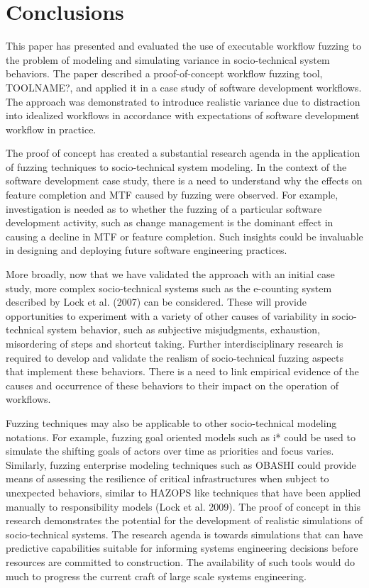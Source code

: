 \documentclass{llncs}
\begin{document}
\section{Conclusions}

This paper has presented and evaluated the use of executable workflow fuzzing to the problem of modeling and simulating
variance in socio-technical system behaviors.  The paper described a proof-of-concept workflow fuzzing tool, TOOLNAME?,
and applied it in a case study of software development workflows.  The approach was demonstrated to introduce realistic
variance due to distraction into idealized workflows in accordance with expectations of software development workflow in
practice.

The proof of concept has created a substantial research agenda in the application of fuzzing techniques to
socio-technical system modeling.  In the context of the software development case study, there is a need to understand
why the effects on feature completion and MTF caused by fuzzing were observed.  For example, investigation is needed as
to whether the fuzzing of a particular software development activity, such as change management is the dominant effect
in causing a decline in MTF or feature completion.  Such insights could be invaluable in designing and deploying future
software engineering practices.

More broadly, now that we have validated the approach with an initial case study, more complex socio-technical systems
such as the e-counting system described by Lock et al. (2007) can be considered.  These will provide opportunities to
experiment with a variety of other causes of variability in socio-technical system behavior, such as subjective
misjudgments, exhaustion, misordering of steps and shortcut taking.  Further interdisciplinary research is required to
develop and validate the realism of socio-technical fuzzing aspects that implement these behaviors. There is a need to
link empirical evidence of the causes and occurrence of these behaviors to their impact on the operation of workflows.

Fuzzing techniques may also be applicable to other socio-technical modeling notations.  For example, fuzzing goal
oriented models such as i* could be used to simulate the shifting goals of actors over time as priorities and focus
varies.  Similarly, fuzzing enterprise modeling techniques such as OBASHI could provide means of assessing the
resilience of critical infrastructures when subject to unexpected behaviors, similar to HAZOPS like techniques that have
been applied manually to responsibility models (Lock et al. 2009). The proof of concept in this research demonstrates
the potential for the development of realistic simulations of socio-technical systems. The research agenda is towards
simulations that can have predictive capabilities suitable for informing systems engineering decisions before resources
are committed to construction.  The availability of such tools would do much to progress the current craft of large
scale systems engineering.
\end{document}
